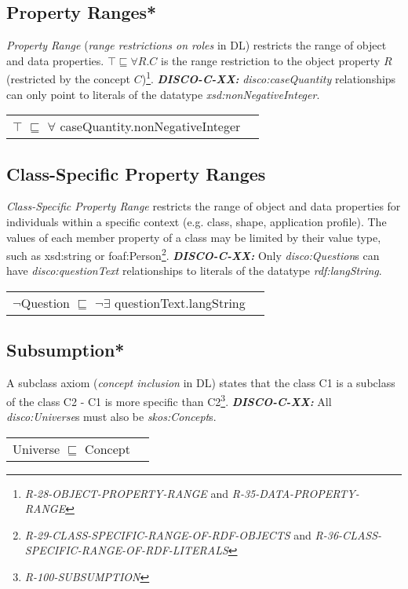 \documentclass{elsart3p}    %
\newenvironment{DL}{
  \vspace{0cm}
  \begin{tabular}{l l}

}{
  \end{tabular}
}
\begin{document}
\subsection{Property Ranges*}

{\em Property Range} ({\em range restrictions on roles} in DL) restricts the range of object and data properties.
$\top \sqsubseteq \forall R . C$ is the range restriction to the object property $R$ (restricted by the concept $C$)\footnote{{\em R-28-OBJECT-PROPERTY-RANGE} and {\em R-35-DATA-PROPERTY-RANGE}}. 
\textbf{{\em DISCO-C-XX:}} 
{\em disco:caseQuantity} relationships can only point to literals of the datatype {\em xsd:nonNegativeInteger}.

\begin{DL}
$\top$ $\sqsubseteq$ $\forall$ caseQuantity.nonNegativeInteger \\
\end{DL}

\subsection{Class-Specific Property Ranges}		

{\em Class-Specific Property Range} restricts the range of object and data properties for individuals within a specific context (e.g. class, shape, application profile).
The values of each member property of a class may be limited by their value type, such as xsd:string or foaf:Person\footnote{{\em R-29-CLASS-SPECIFIC-RANGE-OF-RDF-OBJECTS} and {\em R-36-CLASS-SPECIFIC-RANGE-OF-RDF-LITERALS}}. 
\textbf{{\em DISCO-C-XX:}} 
Only {\em disco:Question}s can have {\em disco:questionText} relationships to literals of the datatype {\em rdf:langString}.

\begin{DL}
$\neg$Question $\sqsubseteq$ $\neg\exists$ questionText.langString
\end{DL}

\subsection{Subsumption*}

A subclass axiom ({\em concept inclusion} in DL) states that the class C1 is a subclass of the class C2 - C1 is more specific than C2\footnote{{\em R-100-SUBSUMPTION}}.
\textbf{{\em DISCO-C-XX:}} 
All {\em disco:Universe}s must also be {\em skos:Concept}s.

\begin{DL}
Universe $\sqsubseteq$ Concept
\end{DL}
\end{document}
